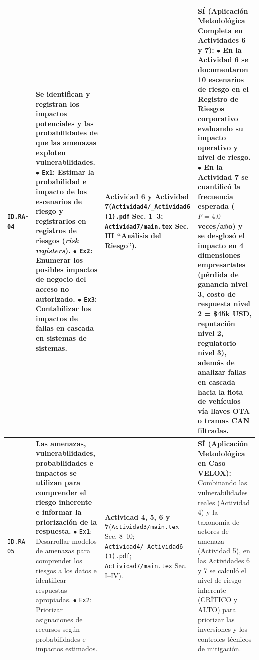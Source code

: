 \documentclass[letterpaper,11pt]{article}
\begin{document}
\begin{longtable}{|C{1.5cm}|L{5.3cm}|L{4.3cm}|L{5.8cm}|}
\texttt{ID.RA-04} &
\textbf{Se identifican y registran los impactos potenciales y las probabilidades de que las amenazas exploten vulnerabilidades.}\newline
$\bullet$ \texttt{Ex1}: Estimar la probabilidad e impacto de los escenarios de riesgo y registrarlos en registros de riesgos (\textit{risk registers}).\newline
$\bullet$ \texttt{Ex2}: Enumerar los posibles impactos de negocio del acceso no autorizado.\newline
$\bullet$ \texttt{Ex3}: Contabilizar los impactos de fallas en cascada en sistemas de sistemas. &
\textbf{Actividad 6 y Actividad 7}\newline (\texttt{Actividad4/\_Actividad6 (1).pdf} Sec. 1--3; \texttt{Actividad7/main.tex} Sec. III ``Análisis del Riesgo''). &
\textbf{SÍ (Aplicación Metodológica Completa en Actividades 6 y 7):}\newline
$\bullet$ En la \textbf{Actividad 6} se documentaron 10 escenarios de riesgo en el Registro de Riesgos corporativo evaluando su impacto operativo y nivel de riesgo.\newline
$\bullet$ En la \textbf{Actividad 7} se cuantificó la frecuencia esperada ($F=4.0$ veces/año) y se desglosó el impacto en 4 dimensiones empresariales (pérdida de ganancia nivel 3, costo de respuesta nivel 2 = \$45k USD, reputación nivel 2, regulatorio nivel 3), además de analizar fallas en cascada hacia la flota de vehículos vía llaves OTA o tramas CAN filtradas. \\
\hline

\texttt{ID.RA-05} &
\textbf{Las amenazas, vulnerabilidades, probabilidades e impactos se utilizan para comprender el riesgo inherente e informar la priorización de la respuesta.}\newline
$\bullet$ \texttt{Ex1}: Desarrollar modelos de amenazas para comprender los riesgos a los datos e identificar respuestas apropiadas.\newline
$\bullet$ \texttt{Ex2}: Priorizar asignaciones de recursos según probabilidades e impactos estimados. &
\textbf{Actividad 4, 5, 6 y 7}\newline (\texttt{Actividad3/main.tex} Sec. 8--10; \texttt{Actividad4/\_Actividad6 (1).pdf}; \texttt{Actividad7/main.tex} Sec. I--IV). &
\textbf{SÍ (Aplicación Metodológica en Caso VELOX):}\newline
Combinando las vulnerabilidades reales (Actividad 4) y la taxonomía de actores de amenaza (Actividad 5), en las Actividades 6 y 7 se calculó el nivel de riesgo inherente (CRÍTICO y ALTO) para priorizar las inversiones y los controles técnicos de mitigación. \\
\hline


\end{longtable}
\end{document}
